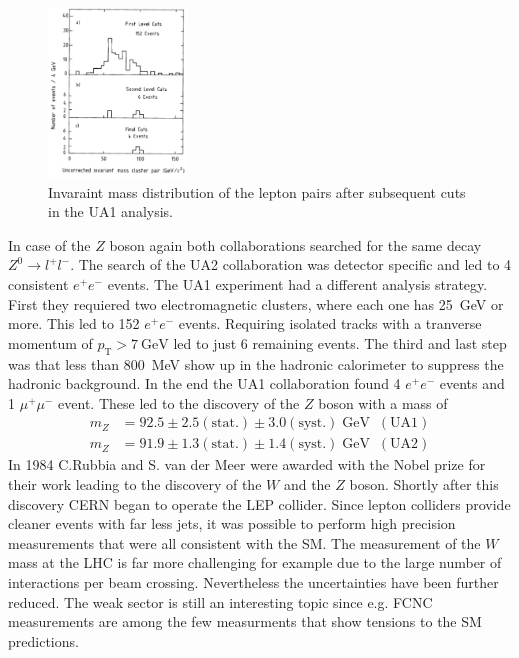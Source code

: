 \begin{figure}
    \includegraphics[width=0.33\textwidth]{graphics/Z.png}
    \caption{Invaraint mass distribution of the lepton pairs after subsequent cuts in the UA1 analysis.\cite{wz}}
		\label{fig:Z}
  \end{figure}
  \FloatBarrier
In case of the $Z$ boson again both collaborations searched for the same decay $Z^0 \rightarrow l^+l^-$. The search of the UA2 collaboration was detector specific and led to 4 consistent $e^+e^-$ events. The UA1 experiment had a different analysis strategy. First they requiered two electromagnetic clusters, where each one has \SI{25}{\GeV} or more. This led to 152 $e^+e^-$ events. Requiring isolated tracks with a tranverse momentum of $p_{\text{T}}>\SI{7}{\GeV}$ led to just 6 remaining events. The third and last step was that less than \SI{800}{\MeV} show up in the hadronic calorimeter to suppress the hadronic background. In the end the UA1 collaboration found 4 $e^+e^-$ events and 1 $\mu^+\mu^-$ event. These led to the discovery of the $Z$ boson with a mass of
\begin{align*}
	m_Z &= 92.5 \pm 2.5(\text{stat.})\pm 3.0(\text{syst.})\;\si{\GeV} \;\; (\text{UA1})\\
	m_Z &= 91.9 \pm 1.3(\text{stat.})\pm 1.4(\text{syst.})\;\si{\GeV} \;\; (\text{UA2})
\end{align*}
In 1984 C.Rubbia and S. van der Meer were awarded with the Nobel prize for their work leading to the discovery of the $W$ and the $Z$ boson.
Shortly after this discovery CERN began to operate the LEP collider. Since lepton colliders provide cleaner events with far less jets, it was possible to perform high precision measurements that were all consistent with the SM. The measurement of the $W$ mass at the LHC is far more challenging for example due to the large number of interactions per beam crossing. Nevertheless the uncertainties have been further reduced. The weak sector is still an interesting topic since e.g. FCNC measurements are among the few measurments that show tensions to the SM predictions.
